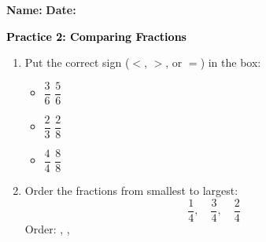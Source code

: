 \documentclass[12pt, letterpaper, fleqn]{article}
\newcommand{\blank}{\underline{\hspace{2.2cm}}}
\begin{document}
\textbf{Name:} \underline{\hspace{5cm}}
\hfill
\textbf{Date:} \underline{\hspace{3cm}}\\

\begin{tcolorbox}[colback=customteal!20]
    \large\textcolor{black}{\textbf{Practice 2: Comparing Fractions}}
\end{tcolorbox}

\vspace{5mm}
\begin{enumerate}[itemsep=2cm, leftmargin=0.6cm]
\item Put the correct sign ($<$, $>$, or $=$) in the box:
  \begin{itemize}[itemsep=0.8cm]
    \item $\dfrac{3}{6}$ \quad \blank \quad $\dfrac{5}{6}$
    \item $\dfrac{2}{3}$ \quad \blank \quad $\dfrac{2}{8}$
    \item $\dfrac{4}{4}$ \quad \blank \quad $\dfrac{8}{8}$
  \end{itemize}

\item Order the fractions from smallest to largest:
\[
  \frac{1}{4}, \quad \frac{3}{4}, \quad \frac{2}{4}
\]
Order: \blank, \blank, \blank
\end{enumerate}
\end{document}
